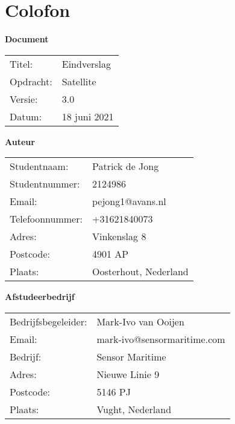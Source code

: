 \chapter*{Colofon}
\textbf{Document}
\begin{table}[h!]
	\begin{tabular}{p{5cm}l}
	Titel:           & Eindverslag  \\
	Opdracht:		 & Satellite  	\\
	Versie:          & 3.0          \\
	Datum:           & 18 juni 2021 \\
	\end{tabular}
\end{table}

\noindent\textbf{Auteur}
\begin{table}[h!]
	\begin{tabular}{p{5cm}l}
	Studentnaam:        & Patrick de Jong             \\
	Studentnummer:      & 2124986                     \\
	Email:              & pejong1@avans.nl            \\
	Telefoonnummer:     & +31621840073                \\
	Adres:				& Vinkenslag 8					\\
	Postcode:			& 4901 AP					\\
	Plaats:				& Oosterhout, Nederland		\\
	\end{tabular}
\end{table}

\noindent\textbf{Afstudeerbedrijf}
\begin{table}[h!]
	\begin{tabular}{p{5cm}l}
	Bedrijfsbegeleider: & Mark-Ivo van Ooijen         \\
	Email:              & mark-ivo@sensormaritime.com \\
	Bedrijf:            & Sensor Maritime             \\
	Adres:				& Nieuwe Linie 9			\\
	Postcode:			& 5146 PJ					\\
	Plaats:				& Vught, Nederland			\\
	\end{tabular}
\end{table}

